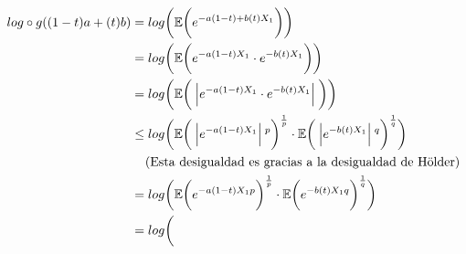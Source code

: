     \begin{align}
        log\circ g ((1-t)a + (t)b)      &=       log\bigg( \E\bigg(e^{-a(1-t) + b(t) X_1}\bigg) \bigg)                              \\
                                        &=       log\bigg( \E\bigg(e^{-a(1-t) X_1} \cdot e^{-b(t) X_1}\bigg) \bigg)                 \\
                                        &=       log\bigg( \E\bigg(\abs{e^{-a(1-t) X_1} \cdot e^{-b(t) X_1}}\bigg) \bigg)           \\
                                        &\leq    log\bigg(
                                                            \E
                                                                \bigg(
                                                                    \abs{e^{-a(1-t) X_1}}^p
                                                                \bigg)^{\frac{1}{p}} 
                                                        \cdot 
                                                            \E
                                                                \bigg(
                                                                    \abs{e^{-b(t) X_1}}^q
                                                                \bigg)^\frac{1}{q}
                                                    \bigg)                                                                          \\
                                        &\;\;\;\;\mbox{(Esta desigualdad es gracias a la desigualdad de Hölder)}                    \\
                                        &=      log\bigg( 
                                                            \E
                                                                \bigg(
                                                                    e^{-a(1-t) X_1 p}
                                                                \bigg)^{\frac{1}{p}} 
                                                        \cdot     
                                                            \E
                                                                \bigg(
                                                                    e^{-b(t) X_1 q}
                                                                \bigg)^\frac{1}{q}
                                                     \bigg)                                                                         \\
                                        &=      log\bigg( 

\end{align}
